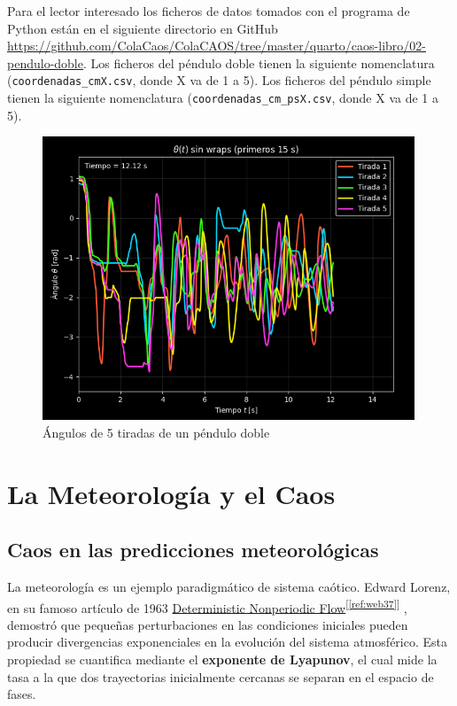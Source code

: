 \documentclass[
  10pt,
  a4paper,
  DIV=11,
  numbers=noendperiod,
  open=any]{scrreprt}
\numberwithin{equation}{chapter}
\numberwithin{equation}{section}
\renewcommand{\[}{\begin{equation}}
\renewcommand{\]}{\end{equation}}
\newcommand{\refweb}[3]{%
  \href{#1}{#2}\textsuperscript{[\ref{ref:#3}]}%
}
\begin{document}
Para el lector interesado los ficheros de datos tomados con el programa de Python están en el siguiente directorio en GitHub \url{https://github.com/ColaCaos/ColaCAOS/tree/master/quarto/caos-libro/02-pendulo-doble}. Los ficheros del péndulo doble tienen la siguiente nomenclatura 
(\texttt{coordenadas\_cmX.csv}, donde X va de 1 a 5). 
Los ficheros del péndulo simple tienen la siguiente nomenclatura 
(\texttt{coordenadas\_cm\_psX.csv}, donde X va de 1 a 5).


\begin{figure}[h]
  \centering
  \includegraphics[width=0.99\textwidth]{02-pendulo-doble/theta_vs_time_doble.png}
  \caption{Ángulos de 5 tiradas de un péndulo doble}
\end{figure}




\part{La Meteorología y el Caos}

\chapter{Caos en las predicciones
meteorológicas}\label{caos-en-las-predicciones-meteorologicas}

La meteorología es un ejemplo paradigmático de sistema caótico. Edward
Lorenz, en su famoso artículo de 1963 \refweb{https://journals.ametsoc.org/view/journals/atsc/20/2/1520-0469_1963_020_0130_dnf_2_0_co_2.xml}{Deterministic Nonperiodic Flow}{web37}, demostró que pequeñas
perturbaciones en las condiciones iniciales pueden producir divergencias
exponenciales en la evolución del sistema atmosférico.
Esta propiedad se cuantifica mediante el \textbf{exponente de Lyapunov},
el cual mide la tasa a la que dos trayectorias inicialmente cercanas se
separan en el espacio de fases.
\end{document}
